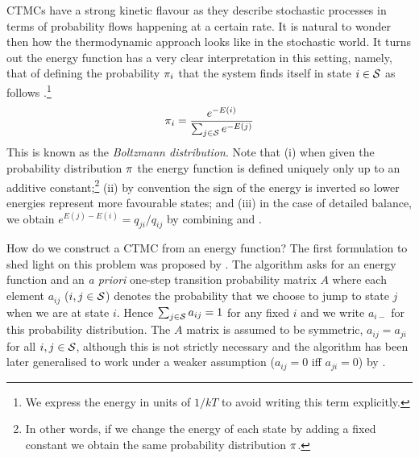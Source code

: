 CTMCs have a strong kinetic flavour as they describe
stochastic processes in terms of probability flows
happening at a certain rate. %
%
It is natural to wonder then how the thermodynamic approach
looks like in the stochastic world.
It turns out the energy function has a very clear interpretation
in this setting, namely, that of defining the probability $\pi_i$
that the system finds itself in state $i \in \mathcal{S}$ as follows
\citep[page 40]{mcquarrie-stat-mech}.\footnote{
  We express the energy in units of $1/kT$
  to avoid writing this term explicitly.}
\begin{equation}
  \label{eq:energy}
  \pi_i = \frac{e^{-E(i)}}{\sum_{j \in \mathcal{S}} e^{-E(j)}}
\end{equation}
This is known as the \emph{Boltzmann distribution}.
Note that
(i) when given the probability distribution $\pi$
the energy function is defined uniquely
only up to an additive constant;\footnote{
  In other words, if we change the energy of each state by adding
  a fixed constant we obtain the same probability distribution $\pi$.}
(ii) by convention the sign of the energy is inverted
so lower energies represent more favourable states; and
(iii) in the case of detailed balance,
we obtain $e^{E(j)-E(i)} = q_{ji}/q_{ij}$
by combining  and .

How do we construct a CTMC
from an energy function?
The first formulation to shed light on this problem
was proposed by \citet{metropolis}.
The algorithm asks for an energy function and
an \emph{a priori} one-step transition probability matrix $A$
where each element $a_{ij}$ ($i,j \in \mathcal{S}$)
denotes the probability that
we choose to jump to state $j$ when we are at state $i$.
Hence $\sum_{j \in \mathcal{S}} a_{ij} = 1$ for any fixed $i$
and we write $a_{i-}$ for this probability distribution.
The $A$ matrix is assumed to be symmetric,
\ie $a_{ij} = a_{ji}$ for all $i,j \in \mathcal{S}$,
although this is not strictly necessary
and the algorithm has been later generalised
to work under a weaker assumption ($a_{ij} = 0$ iff $a_{ji} = 0$)
by \citet{hastings}.

